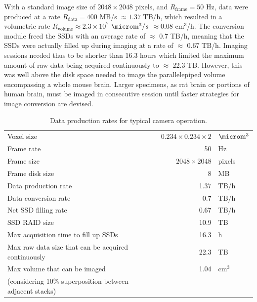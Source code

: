 \documentclass[12pt]{spieman}  %
\begin{document}
\begin{spacing}{2}
With a standard image size of $2048 \times 2048$ pixels, and $R_{\text{frame}}=50$ Hz, data were produced at a rate $R_{\text{data}}=400$ MB/s $\approx 1.37$ TB/h, which resulted in a volumetric rate $R_{\text{volume}} \approx 2.3 \times 10^7$ $\micro\text{m}^3/s$ $\approx 0.08$ $\text{cm}^3$/h. The conversion module freed the SSDs with an average rate of $\approx$ 0.7 TB/h, meaning that the SSDs were actually filled up during imaging at a rate of $\approx$ 0.67 TB/h. Imaging sessions needed thus to be shorter than 16.3 hours which limited the maximum amount of raw data being acquired continuously to $\approx$ 22.3 TB. However, this was well above the disk space needed to image the parallelepiped volume encompassing a whole mouse brain. Larger specimens, as rat brain or portions of human brain, must be imaged in consecutive session until faster strategies for image conversion are devised.

\begin{table}%
	\centering
		\caption[Data production]{Data production rates for typical camera operation.\label{tab:dataproduction}}
		\begin{tabular}{lrl}
		\\
		Voxel size																								& $0.234 \times 0.234 \times 2$	& $\micro\text{m}^3$ 	\\
		Frame rate																								& 50														& Hz								\\
		Frame size																								& $2048 \times 2048$ 						& pixels						\\
		Frame disk size																						& 8									 						& MB								\\
		Data production rate																			& 1.37							 						& TB/h 							\\
		Data conversion rate																			& 0.7								 						& TB/h 							\\
		Net SSD filling rate																			& 0.67							 						& TB/h 							\\
		SSD RAID size																							& 10.9							 						& TB								\\
		Max acquisition time to fill up SSDs											& 16.3							 						& h									\\
		Max raw data size that can be acquired continuously				& 22.3							 						& TB								\\
		Max volume that can be imaged 														& 1.04							 						& $\text{cm}^3$ 		\\
		(considering 10\% superposition between adjacent stacks)	&										 						&										\\
		\end{tabular}
\end{table}


\end{spacing}
\end{document}
